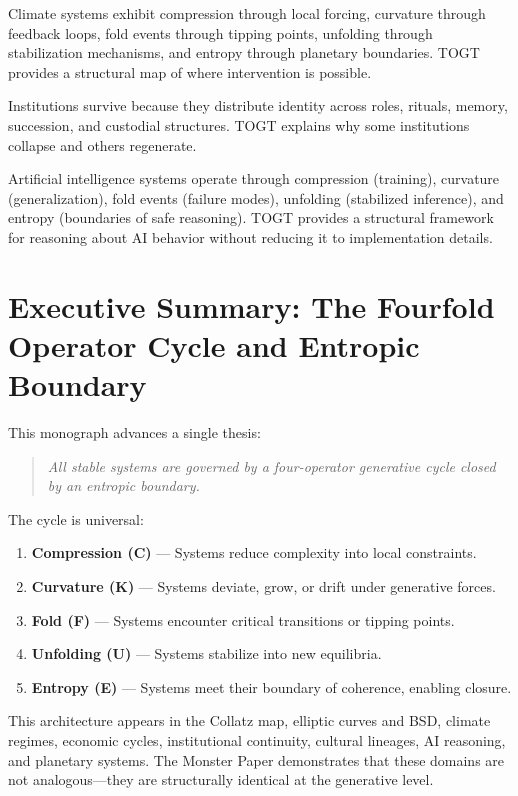 \documentclass[14pt, twoside, openright]{book}
\theoremstyle{definition}
\theoremstyle{remark}
\newenvironment{structuralclaim}{%
  \begin{quote}\itshape}{\end{quote}}
\begin{document}
Climate systems exhibit compression through local forcing, curvature through
feedback loops, fold events through tipping points, unfolding through
stabilization mechanisms, and entropy through planetary boundaries. TOGT provides
a structural map of where intervention is possible.

Institutions survive because they distribute identity across roles, rituals,
memory, succession, and custodial structures. TOGT explains why some institutions
collapse and others regenerate.

Artificial intelligence systems operate through compression (training), curvature
(generalization), fold events (failure modes), unfolding (stabilized inference),
and entropy (boundaries of safe reasoning). TOGT provides a structural framework
for reasoning about AI behavior without reducing it to implementation details.

\chapter{Executive Summary: The Fourfold Operator Cycle and Entropic Boundary}

This monograph advances a single thesis:

\begin{structuralclaim}
All stable systems are governed by a four-operator generative cycle closed by
an entropic boundary.
\end{structuralclaim}

The cycle is universal:

\begin{enumerate}[leftmargin=2em]
  \item \textbf{Compression (C)} --- Systems reduce complexity into local constraints.
  \item \textbf{Curvature (K)} --- Systems deviate, grow, or drift under generative forces.
  \item \textbf{Fold (F)} --- Systems encounter critical transitions or tipping points.
  \item \textbf{Unfolding (U)} --- Systems stabilize into new equilibria.
  \item \textbf{Entropy (E)} --- Systems meet their boundary of coherence, enabling closure.
\end{enumerate}

This architecture appears in the Collatz map, elliptic curves and BSD, climate
regimes, economic cycles, institutional continuity, cultural lineages, AI
reasoning, and planetary systems. The Monster Paper demonstrates that these
domains are not analogous---they are structurally identical at the generative
level.
\end{document}
